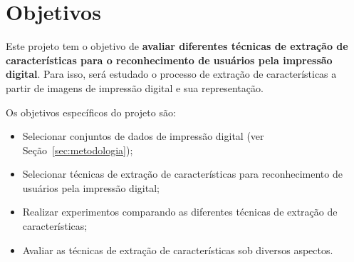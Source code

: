 \section{Objetivos}\label{sec:objetivos}

Este projeto tem o objetivo de \textbf{avaliar diferentes técnicas de extração de características para o reconhecimento de usuários pela impressão digital}. Para isso, será estudado o processo de extração de características a partir de imagens de impressão digital e sua representação.

Os objetivos específicos do projeto são:

\begin{itemize}
    \item Selecionar conjuntos de dados de impressão digital (ver Seção~\ref{sec:metodologia});
    \item Selecionar técnicas de extração de características para reconhecimento de usuários pela impressão digital;
    \item Realizar experimentos comparando as diferentes técnicas de extração de características;
    \item Avaliar as técnicas de extração de características sob diversos aspectos.
\end{itemize}
